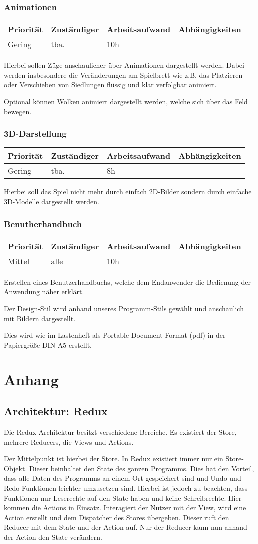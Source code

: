 \documentclass[a4paper]{scrreprt}
\newenvironment{requirement}[5] {
	\subsection{#1}
	\begin{tabularx}{\textwidth}{|X|l|X|X|}
		\hline
		Priorität & Zuständiger & Arbeitsaufwand & Abhängigkeiten \\
		\hline
		#2 & #3 & #4 & #5 \\
		\hline
	\end{tabularx}
	}{
	\newpage
	}
\begin{document}
\begin{requirement}{Animationen}{Gering}{tba.}{10h}{}

Hierbei sollen Züge anschaulicher über Animationen dargestellt werden. Dabei werden insbesondere die Veränderungen am Spielbrett wie z.B. das Platzieren oder Verschieben von Siedlungen flüssig und klar verfolgbar animiert.

Optional können Wolken animiert dargestellt werden, welche sich über das Feld bewegen.

\end{requirement}


\begin{requirement}{3D-Darstellung}{Gering}{tba.}{8h}{}

Hierbei soll das Spiel nicht mehr durch einfach 2D-Bilder sondern durch einfache 3D-Modelle dargestellt werden.

\end{requirement}

\begin{requirement}{Benutherhandbuch}{Mittel}{alle}{10h}{}

Erstellen eines Benutzerhandbuchs, welche dem Endanwender die Bedienung der Anwendung näher erklärt. 

Der Design-Stil wird anhand unseres Programm-Stils gewählt und anschaulich mit Bildern dargestellt.

Dies wird wie im Lastenheft als Portable Document Format (pdf) in der Papiergröße DIN A5 erstellt.

\end{requirement}


\chapter{Anhang}
\section{Architektur: Redux}
Die Redux Architektur besitzt verschiedene Bereiche. Es existiert der Store, mehrere Reducers, die Views und Actions.

Der Mittelpunkt ist hierbei der Store. In Redux existiert immer nur ein Store-Objekt. Dieser beinhaltet den State des ganzen Programms. Dies hat den Vorteil, dass alle Daten des Programms an einem Ort gespeichert sind und Undo und Redo Funktionen leichter umzusetzen sind. Hierbei ist jedoch zu beachten, dass Funktionen nur Leserechte auf den State haben und keine Schreibrechte.
Hier kommen die Actions in Einsatz. Interagiert der Nutzer mit der View, wird eine Action erstellt und dem Dispatcher des Stores übergeben. Dieser ruft den Reducer mit dem State und der Action auf. Nur der Reducer kann nun anhand der Action den State verändern.
\end{document}
